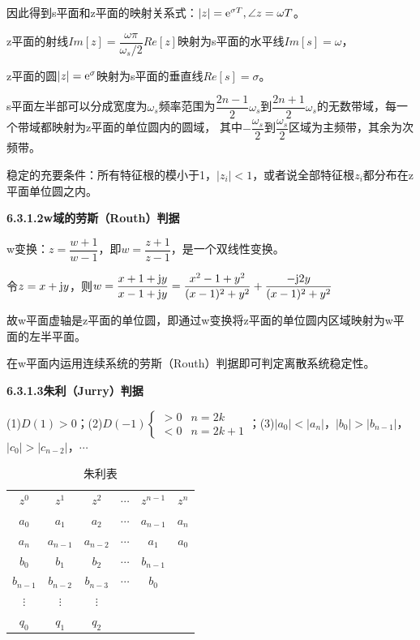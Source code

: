 \documentclass[11pt,a4paper]{ctexart}
\newcommand{\e}{{\rm e}}
\renewcommand{\j}{{\rm j}}
\begin{document}
            因此得到s平面和z平面的映射关系式：$|z|=\e^{\sigma T},\angle z=\omega T$。

            z平面的射线$Im[z]=\dfrac{\omega\pi }{\omega_s/2}Re[z]$映射为s平面的水平线$Im[s]=\omega$，

            z平面的圆$|z|=\e^\sigma$映射为s平面的垂直线$Re[s]=\sigma$。
            
            s平面左半部可以分成宽度为$\omega_s$频率范围为$\dfrac{2n-1}{2}\omega_s$到$\dfrac{2n+1}{2}\omega_s$的无数带域，每一个带域都映射为z平面的单位圆内的圆域，
            其中$-\dfrac{\omega_s}{2}$到$\dfrac{\omega_s}{2}$区域为主频带，其余为次频带。
            
            稳定的充要条件：所有特征根的模小于1，$|z_i|<1$，或者说全部特征根$z_i$都分布在z平面单位圆之内。

            {\setlength{\parindent}{0pt}\textbf{6.3.1.2\quad w域的劳斯（Routh）判据}}

            w变换：$z=\dfrac{w+1}{w-1}$，即$w=\dfrac{z+1}{z-1}$，是一个双线性变换。

            令$z=x+\j y$，则$w=\dfrac{x+1+\j y}{x-1+\j y}=\dfrac{x^2-1+y^2}{(x-1)^2+y^2}+\dfrac{-\j2y}{(x-1)^2+y^2}$

            故w平面虚轴是z平面的单位圆，即通过w变换将z平面的单位圆内区域映射为w平面的左半平面。

            在w平面内运用连续系统的劳斯（Routh）判据即可判定离散系统稳定性。

            {\setlength{\parindent}{0pt}\textbf{6.3.1.3\quad 朱利（Jurry）判据}}

            (1)$D(1)>0$；(2)$D(-1)\begin{cases}>0&n=2k\\<0&n=2k+1\end{cases}$；(3)$|a_0|<|a_n|$，$|b_0|>|b_{n-1}|$，$|c_0|>|c_{n-2}|$，$\cdots$
            \begin{table}[H]
                \centering
                \caption{朱利表}
                \begin{tabular}{c c c c c c}
                    $z^0$ & $z^1$ & $z^2$ & $\cdots$ & $z^{n-1}$ & $z^n$\\
                    $a_0$ & $a_1$ & $a_2$ & $\cdots$ & $a_{n-1}$ & $a_n$\\
                    $a_n$ & $a_{n-1}$ & $a_{n-2}$ & $\cdots$ & $a_1$ & $a_0$\\
                    $b_0$ & $b_1$ & $b_2$ & $\cdots$ & $b_{n-1}$ & \\
                    $b_{n-1}$ & $b_{n-2}$ & $b_{n-3}$ & $\cdots$ & $b_0$ & \\
                    $\vdots$ & $\vdots$ & $\vdots$ &  &  & \\
                    $q_0$ & $q_1$ & $q_2$ & & & \\
                \end{tabular}
            \end{table}
\end{document}
